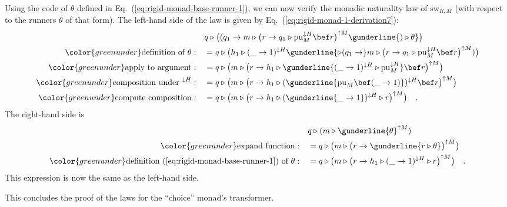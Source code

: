 Using the code of $\theta$ defined in Eq.~(\ref{eq:rigid-monad-base-runner-1}),
we can now verify the monadic naturality law of $\text{sw}_{R,M}$
(with respect to the runners $\theta$ of that form). The left-hand
side of the law is given by Eq.~(\ref{eq:rigid-monad-1-derivation7}):
\begin{align*}
 & q\triangleright\big((q_{1}\rightarrow m\triangleright\big(r\rightarrow q_{1}\triangleright\text{pu}_{M}^{\downarrow H}\bef r\big)^{\uparrow M}\gunderline{)\triangleright\theta}\big)\\
{\color{greenunder}\text{definition of }\theta:}\quad & =q\triangleright\big(h_{1}\triangleright(\_\rightarrow1)^{\downarrow H}\gunderline{\triangleright(q_{1}\rightarrow}m\triangleright\big(r\rightarrow q_{1}\triangleright\text{pu}_{M}^{\downarrow H}\bef r\big)^{\uparrow M})\big)\\
{\color{greenunder}\text{apply to argument}:}\quad & =q\triangleright\big(m\triangleright\big(r\rightarrow h_{1}\triangleright\gunderline{(\_\rightarrow1)^{\downarrow H}\triangleright\text{pu}_{M}^{\downarrow H}}\bef r\big)^{\uparrow M}\big)\\
{\color{greenunder}\text{composition under }^{\downarrow H}:}\quad & =q\triangleright\big(m\triangleright\big(r\rightarrow h_{1}\triangleright(\gunderline{\text{pu}_{M}\bef(\_\rightarrow1)})^{\downarrow H}\bef r\big)^{\uparrow M}\big)\\
{\color{greenunder}\text{compute composition}:}\quad & =q\triangleright\big(m\triangleright\big(r\rightarrow h_{1}\triangleright(\gunderline{\_\rightarrow1})^{\downarrow H}\triangleright r\big)^{\uparrow M}\big)\quad.
\end{align*}
The right-hand side is
\begin{align*}
 & q\triangleright(m\triangleright\gunderline{\theta}^{\uparrow M})\\
{\color{greenunder}\text{expand function}:}\quad & =q\triangleright\big(m\triangleright\big(r\rightarrow\gunderline{r\triangleright\theta}\big)^{\uparrow M}\big)\\
{\color{greenunder}\text{definition~(\ref{eq:rigid-monad-base-runner-1}) of }\theta:}\quad & =q\triangleright\big(m\triangleright\big(r\rightarrow h_{1}\triangleright(\_\rightarrow1)^{\downarrow H}\triangleright r\big)^{\uparrow M}\big)\quad.
\end{align*}
This expression is now the same as the left-hand side.

This concludes the proof of the laws for the \textsf{``}choice\textsf{''} monad\textsf{'}s
transformer.

